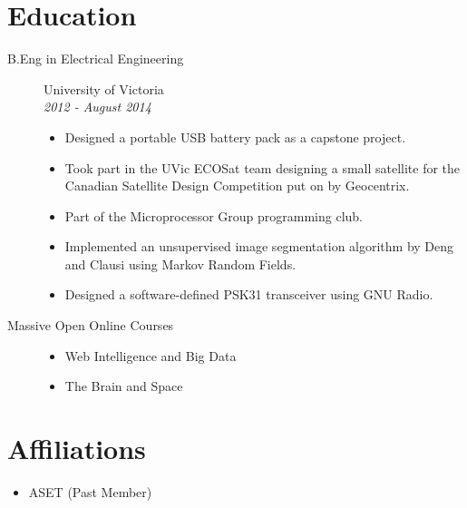 \documentclass[a4paper, 10pt]{article}
\begin{document}
\section{Education}
  \begin{description}
    \item[B.Eng in Electrical Engineering] \hfill University of Victoria\\
    \emph{2012 -  August 2014}
      \begin{itemize}
        \item Designed a portable USB battery pack as a capstone project.
        \item Took part in the UVic ECOSat team designing a small satellite for the Canadian Satellite Design Competition put on by Geocentrix.
        \item Part of the Microprocessor Group programming club.
        \item Implemented an unsupervised image segmentation algorithm by Deng and Clausi using Markov Random Fields.
        \item Designed a software-defined PSK31 transceiver using GNU Radio. 
      \end{itemize}
    \item[Massive Open Online Courses] \hfill
      \begin{itemize}
        \item Web Intelligence and Big Data
        \item The Brain and Space
      \end{itemize}
  \end{description}
  
\section{Affiliations}
  \begin{itemize}
    \item ASET (Past Member)
  \end{itemize}
  
\end{document}
